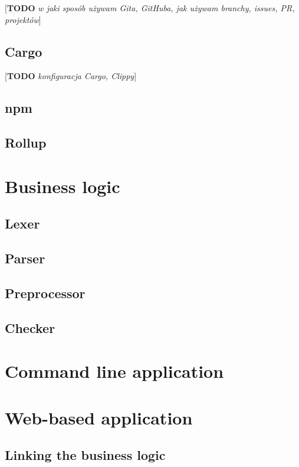 \documentclass[english,engineering]{wizthesis}
\newcommand{\todo}[1]{{\color{red}[\textbf{TODO} \textit{#1}]}}
\begin{document}
\todo{w jaki sposób używam Gita, GitHuba, jak używam branchy, issues, PR,
projektów}

\subsection{Cargo}

\todo{konfiguracja Cargo, Clippy}

\subsection{npm}

\subsection{Rollup}

\section{Business logic}

\subsection{Lexer}

\subsection{Parser}

\subsection{Preprocessor}

\subsection{Checker}

\section{Command line application}

\section{Web-based application}

\subsection{Linking the business logic}
\end{document}

